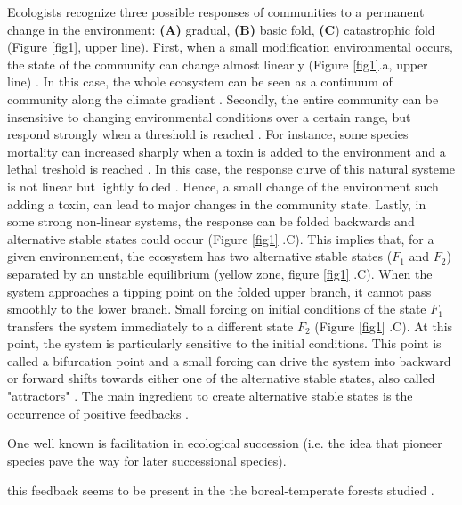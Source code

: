 Ecologists recognize three possible responses of communities to a permanent change in the environment: \textbf{(A)}
gradual, \textbf{(B)} basic fold, \textbf{(C}) catastrophic fold
\cite{Scheffer2001} (Figure \ref{fig1}, upper line). First, when a small
modification environmental occurs, the state of the community can change
almost linearly (Figure \ref{fig1}.a, upper line)
\cite{Scheffer2001,Scheffer2009}. In this case, the whole ecosystem can be
seen as a continuum of community along the climate gradient
\cite{Scheffer2001,Scheffer2009,scheffer2009critical}. Secondly, the entire
community can be insensitive to changing environmental conditions over a
certain range, but respond strongly when a threshold is reached
\cite{scheffer2009critical}. For instance, some species mortality can
increased sharply when a toxin is added to the environment and a lethal
treshold is reached \cite{scheffer2009critical}. In this case, the response
curve of this natural systeme is not linear but lightly folded . Hence, a small
change of the environment such adding a toxin, can lead to major changes in the 
community state. Lastly, in some strong non-linear systems, the response can
be folded backwards and alternative stable states could occur (Figure
\ref{fig1} .C). This implies that, for a given environnement,
the ecosystem has two alternative stable states ($F_1$ and $F_2$) separated by
an unstable equilibrium (yellow zone, figure \ref{fig1} .C). When the system
approaches a tipping point on the folded upper branch, it cannot pass smoothly
to the lower branch. Small forcing on initial conditions of the state $F_1$
transfers the system immediately to a different state $F_2$ (Figure
\ref{fig1} .C). At this point, the system is particularly sensitive to
the initial conditions. This point is called a bifurcation point and a small
forcing can drive the system into backward or forward shifts towards
either one of the alternative stable states, also called "attractors"
\cite{scheffer2009critical}. The main ingredient to create alternative
stable states is the occurrence of positive feedbacks
\cite{scheffer2009critical,Schroder2005}.

One well known is
facilitation in ecological succession (i.e. the idea that pioneer species pave
the way for later successional species). 


 this feedback seems to be present in the the
boreal-temperate forests studied \cite{Barras1998,Society2014}. \\

